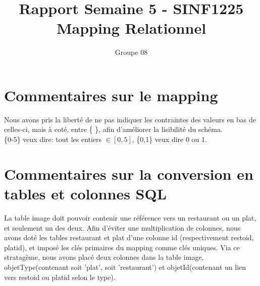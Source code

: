 \documentclass[10pt,a4paper,landscape]{article}
\title{Rapport Semaine 5 - SINF1225\\Mapping Relationnel}
\author{Groupe 08}
\begin{document}
\maketitle
\section{Commentaires sur le mapping}
Nous avons pris la liberté de ne pas indiquer les contraintes des valeurs en bas de celles-ci, mais à coté, entre \{ \}, afin d'améliorer la lisibilité du schéma.\\
\{0-5\} veux dire: tout les entiers $\in [0,5]$, \{0,1\} veux dire 0 ou 1.\\
\section{Commentaires sur la conversion en tables et colonnes SQL}
La table image doit pouvoir contenir une référence vers un restaurant ou un plat, et seulement un des deux. Afin d'éviter une multiplication de colonnes, nous avons doté les tables restaurant et plat d'une colonne id (respectivement restoid, platid), et imposé les clés primaires du mapping comme clés uniques. Via ce stratagème, nous avons placé deux colonnes dans la table image, objetType(contenant soit 'plat', soit 'restaurant') et objetId(contenant un lien vers restoid ou platid selon le type).
\end{document}
